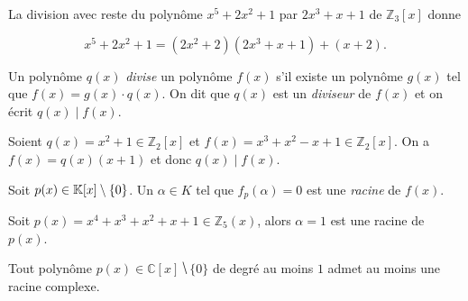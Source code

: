 

\begin{example}
  \label{exe:24}
  La division avec reste du polynôme $x^5+2x^2+1$ par $2x^3+x+1$ de $ℤ_3[x]$ donne

  \begin{displaymath}
    x^5+2x^2+1 = (2x^2 +2) (2x^3 + x +1) + (x+2). 
  \end{displaymath}
  
\end{example}






\begin{definition}
  \label{def:32}
  Un polynôme  $q(x)$ \emph{divise} un  polynôme $f(x)$ s'il existe un polynôme $g(x)$ tel que $f(x) = g(x) \cdot q(x)$. On dit que $q(x)$ est un \emph{diviseur} de $f(x)$ et on écrit $q(x) \mid f(x)$. 
\end{definition}


\begin{example}
  \label{exe:41}
  Soient $q(x) = x^2 +1 ∈ℤ_2[x]$ et $ f(x) = x^3 + x^2 - x+1 ∈ ℤ_2[x]$. On a
  $f(x) = q(x) (x+1)$ et donc 
   $q(x) \mid f(x)$. 
\end{example}


\begin{definition}
  \label{def:31}
  Soit $p(x) \in \mathbb{K}[x] \setminus\{0\}$. Un $\alpha \in K$ tel que $f_p(\alpha) = 0$ est une  \emph{racine} de $f(x)$.  
\end{definition}


\begin{example}
  \label{exe:40}
  Soit $p(x) = x^4 + x^3 + x^2 + x + 1 ∈ ℤ_5(x)$, alors $α = 1$ est une racine de $p(x)$. 
\end{example}


\begin{theorem}
  \label{thr:44}
  Tout polynôme $p(x) ∈ℂ[x] ⧹\{0\}$ de degré au moins $1$  admet au moins une racine complexe.
\end{theorem}




